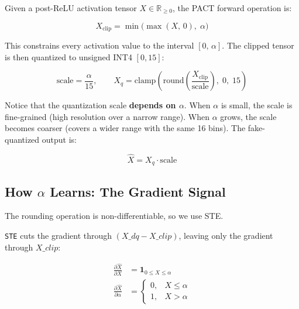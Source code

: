 \documentclass{article}
\begin{document}
Given a post-ReLU activation tensor $X \in \mathbb{R}_{\ge 0}$, the PACT forward operation is:

\begin{equation}
X_{\text{clip}} = \min\!\big(\max(X,\,0),\; \alpha\big)
\label{eq:clip}
\end{equation}

This constrains every activation value to the interval $[0,\, \alpha]$. The clipped tensor
is then quantized to unsigned INT4 $[0,15]$:

\begin{equation}
\text{scale} = \frac{\alpha}{15}, \qquad
X_{q} = \text{clamp}\!\left(\text{round}\!\left(\frac{X_{\text{clip}}}{\text{scale}}\right),\; 0,\; 15\right)
\label{eq:quant}
\end{equation}

Notice that the quantization scale \textbf{depends on $\alpha$}. When $\alpha$ is small,
the scale is fine-grained (high resolution over a narrow range). When $\alpha$ grows,
the scale becomes coarser (covers a wider range with the same 16 bins). The fake-quantized
output is:

\begin{equation}
\hat{X} = X_{q} \cdot \text{scale}
\label{eq:dequant}
\end{equation}

\subsection{How $\alpha$ Learns: The Gradient Signal}

The rounding operation is non-differentiable, so we use STE.




\lstset{
  breaklines=true,   %
  basicstyle=\ttfamily\small,
}
\texttt{STE} cuts the gradient through $(X\_dq - X\_clip)$, leaving only the
gradient through $X\_clip$:

\begin{align}
\frac{\partial \hat{X}}{\partial X} &= \mathbf{1}_{0 \le X \le \alpha} \label{eq:ste_x} \\[4pt]
\frac{\partial \hat{X}}{\partial \alpha} &=
\begin{cases}
0, & X \le \alpha \\[2pt]
1, & X > \alpha
\end{cases} \label{eq:ste_alpha}
\end{align}
\end{document}
